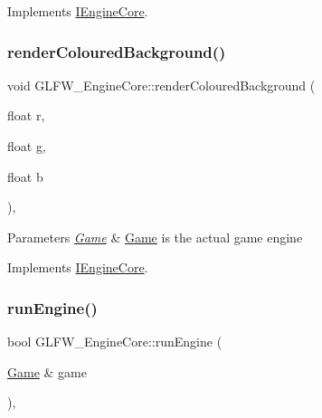 Implements \mbox{\hyperlink{class_i_engine_core}{I\+Engine\+Core}}.

\mbox{\label{class_g_l_f_w___engine_core_a6031a54b0978d6e0fd1be3f292c2059f}} 
\subsubsection{\texorpdfstring{renderColouredBackground()}{renderColouredBackground()}}
{\footnotesize\ttfamily void G\+L\+F\+W\+\_\+\+Engine\+Core\+::render\+Coloured\+Background (\begin{DoxyParamCaption}\item[{float}]{r,  }\item[{float}]{g,  }\item[{float}]{b }\end{DoxyParamCaption})\hspace{0.3cm}{\ttfamily [override]}, {\ttfamily [virtual]}}


\begin{DoxyParams}{Parameters}
{\em \mbox{\hyperlink{class_game}{Game}}} & \mbox{\hyperlink{class_game}{Game}} is the actual game engine \\
\hline
\end{DoxyParams}


Implements \mbox{\hyperlink{class_i_engine_core}{I\+Engine\+Core}}.

\mbox{\label{class_g_l_f_w___engine_core_adf9266f1a9b5d97992691224f0f20c7b}} 
\subsubsection{\texorpdfstring{runEngine()}{runEngine()}}
{\footnotesize\ttfamily bool G\+L\+F\+W\+\_\+\+Engine\+Core\+::run\+Engine (\begin{DoxyParamCaption}\item[{\mbox{\hyperlink{class_game}{Game}} \&}]{game }\end{DoxyParamCaption})\hspace{0.3cm}{\ttfamily [override]}, {\ttfamily [virtual]}}


